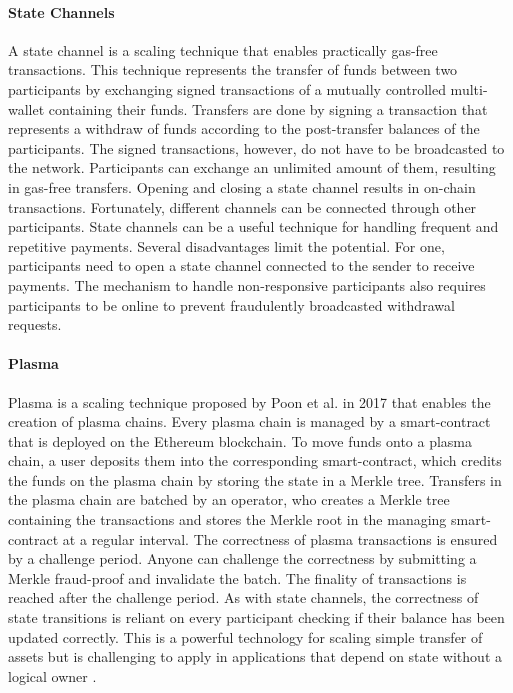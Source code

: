 \documentclass[../../thesis.tex]{subfiles}
\begin{document}
\paragraph{State Channels}
A state channel \cite{coleman2015state} is a scaling technique that enables practically gas-free transactions. This technique represents the transfer of funds between two participants by exchanging signed transactions of a mutually controlled multi-wallet containing their funds. Transfers are done by signing a transaction that represents a withdraw of funds according to the post-transfer balances of the participants. The signed transactions, however, do not have to be broadcasted to the network. Participants can exchange an unlimited amount of them, resulting in gas-free transfers. Opening and closing a state channel results in on-chain transactions. Fortunately, different channels can be connected through other participants. State channels can be a useful technique for handling frequent and repetitive payments. Several disadvantages limit the potential. For one, participants need to open a state channel connected to the sender to receive payments. The mechanism to handle non-responsive participants also requires participants to be online to prevent fraudulently broadcasted withdrawal requests.

\paragraph{Plasma}
Plasma is a scaling technique proposed by Poon et al. \cite{poon2017plasma} in 2017 that enables the creation of plasma chains. Every plasma chain is managed by a smart-contract that is deployed on the Ethereum blockchain. To move funds onto a plasma chain, a user deposits them into the corresponding smart-contract, which credits the funds on the plasma chain by storing the state in a Merkle tree. Transfers in the plasma chain are batched by an operator, who creates a Merkle tree containing the transactions and stores the Merkle root in the managing smart-contract at a regular interval. The correctness of plasma transactions is ensured by a challenge period. Anyone can challenge the correctness by submitting a Merkle fraud-proof and invalidate the batch. The finality of transactions is reached after the challenge period. As with state channels, the correctness of state transitions is reliant on every participant checking if their balance has been updated correctly. This is a powerful technology for scaling simple transfer of assets but is challenging to apply in applications that depend on state without a logical owner \cite{vitalik2020rollup}.
\end{document}
